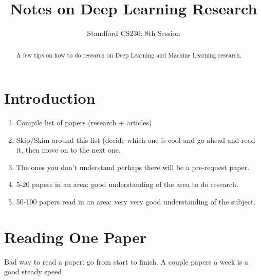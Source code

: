 \documentclass{article}
\title{Notes on Deep Learning Research}
\author{Standford CS230: 8th Session}
\begin{document}
\maketitle

\begin{abstract}
A few tips on how to do research on Deep Learning and Machine Learning research.
\end{abstract}

\section{Introduction}
\begin{enumerate}
    \item Compile list of papers (research + articles)
    \item Skip/Skim around this list (decide which one is cool and go ahead and read it, then move on to the next one.
    \item The ones you don't understand perhaps there will be a pre-request paper.
    \item 5-20 papers in an area: good  understanding of the area to do research.
    \item 50-100 papers read in an area: very very good understanding of the subject.
\end{enumerate}

\section{Reading One Paper}
Bad way to read a paper: go from start to finish.
A couple papers a week is a good steady speed
\end{document}
